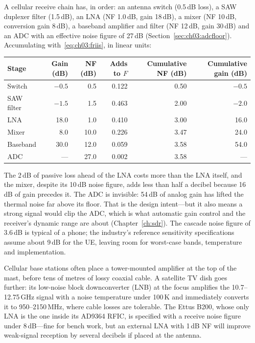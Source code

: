 \begin{worked}
A cellular receive chain has, in order: an antenna switch (0.5\,dB loss), a SAW duplexer filter
(1.5\,dB), an LNA (NF 1.0\,dB, gain 18\,dB), a mixer (NF 10\,dB, conversion gain 8\,dB), a baseband
amplifier and filter (NF 12\,dB, gain 30\,dB) and an ADC with an effective noise figure of 27\,dB
(Section~\ref{sec:ch03:adcfloor}). Accumulating with~\eqref{eq:ch03:friis}, in linear units:
\begin{center}\small
\begin{tabular}{@{}lrrrrr@{}}
\toprule
Stage & Gain (dB) & NF (dB) & Adds to $F$ & Cumulative NF (dB) & Cumulative gain (dB)\\
\midrule
Switch & $-0.5$ & 0.5 & 0.122 & 0.50 & $-0.5$\\
SAW filter & $-1.5$ & 1.5 & 0.463 & 2.00 & $-2.0$\\
LNA & 18.0 & 1.0 & 0.410 & 3.00 & 16.0\\
Mixer & 8.0 & 10.0 & 0.226 & 3.47 & 24.0\\
Baseband & 30.0 & 12.0 & 0.059 & 3.58 & 54.0\\
ADC & --- & 27.0 & 0.002 & 3.58 & ---\\
\bottomrule
\end{tabular}
\end{center}
The 2\,dB of passive loss ahead of the LNA costs more than the LNA itself, and the mixer, despite its
10\,dB noise figure, adds less than half a decibel because 16\,dB of gain precedes it. The ADC is
invisible: 54\,dB of analog gain has lifted the thermal noise far above its floor. That is the design
intent---but it also means a strong signal would clip the ADC, which is what automatic gain control and
the receiver's dynamic range are about (Chapter~\ref{ch:sdr}). The cascade noise figure of 3.6\,dB is
typical of a phone; the industry's reference sensitivity specifications assume about 9\,dB for the UE,
leaving room for worst-case bands, temperature and implementation.
\end{worked}

\begin{inpractice}
Cellular base stations often place a tower-mounted amplifier at the top of the mast, before tens of
metres of lossy coaxial cable. A satellite TV dish goes further: its low-noise block downconverter (LNB)
at the focus amplifies the 10.7--12.75\,GHz signal with a noise temperature under 100\,K and immediately
converts it to 950--2150\,MHz, where cable losses are tolerable. The Ettus B200, whose only LNA is the one
inside its AD9364 RFIC, is specified with a receive noise figure under 8\,dB---fine for bench work, but an
external LNA with 1\,dB NF will improve weak-signal reception by several decibels if placed at the antenna.
\end{inpractice}

